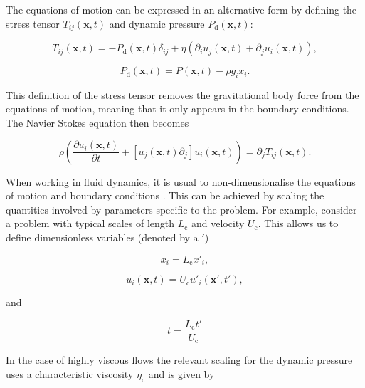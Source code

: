 \documentclass[12pt]{article}
\begin{document}
The equations of motion can be expressed in an alternative form by defining the stress tensor $T_{ij}(\boldsymbol{x},t)$ \citep{Batchelor67, Manga94} and dynamic pressure $P_{\text{d}}(\boldsymbol{x},t)$:

\begin{equation}
\label{equ:stress}
T_{ij}(\boldsymbol{x},t) = -P_{\text{d}}(\boldsymbol{x},t)  \delta_{ij} + \eta(\partial_{i} u_{j}(\boldsymbol{x},t) + \partial_{j} u_{i}(\boldsymbol{x},t)), 
\end{equation}

\begin{equation}
\label{equ:dyn_P}
P_{\text{d}}(\boldsymbol{x},t) = P(\boldsymbol{x},t) - \rho g_{i} x_{i} .
\end{equation}

This definition of the stress tensor removes the gravitational body force from the equations of motion, meaning that it only appears in the boundary conditions. The Navier Stokes equation then becomes

\begin{equation}
\label{equ:NS_stress}
\rho \left( \frac{\partial u_{i}(\boldsymbol{x},t)}{\partial t} + [u_{j}(\boldsymbol{x},t) \partial_{j}] u_{i}(\boldsymbol{x},t) \right) = \partial_{j} T_{ij}(\boldsymbol{x},t) .
\end{equation}

When working in fluid dynamics, it is usual to non-dimensionalise the equations of motion and boundary conditions \citep{White99}. This can be achieved by scaling the quantities involved by parameters specific to the problem. For example, consider a problem with typical scales of length $L_{\text{c}}$ and velocity $U_{\text{c}}$. This allows us to define dimensionless variables (denoted by a $'$)

\begin{equation} 
\label{equ:nodim_l}
x_{i} = L_{\text{c}} x'_{i} ,
\end{equation}

\begin{equation}
\label{equ:nodim_u}
u_{i}(\boldsymbol{x},t) = U_{\text{c}} u'_{i}(\boldsymbol{x'},t') ,
\end{equation}

and 

\begin{equation}
\label{equ:nodim_t}
t = \frac{L_{\text{c}} t'}{U_{\text{c}}}
\end{equation}

In the case of highly viscous flows the relevant scaling for the dynamic pressure uses a characteristic viscosity $\eta_{\text{c}}$ and is given by\citet{Lee82}
\end{document}
